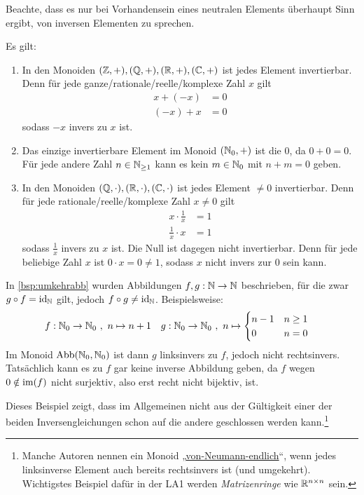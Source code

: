 \begin{bem}
    Beachte, dass es nur bei Vorhandensein eines neutralen Elements überhaupt Sinn ergibt, von inversen Elementen zu sprechen. 
\end{bem}


\begin{bsp} \label{bsp:inverse}
    Es gilt:
    \begin{enumerate}
        \item In den Monoiden $(\mathbb Z,+),(\mathbb Q,+),(\mathbb R,+),(\mathbb C,+)$ ist jedes Element invertierbar. Denn für jede ganze/rationale/reelle/komplexe Zahl $x$ gilt
        \begin{align*}
            x + (-x) & = 0 \\
            (-x) + x & = 0
        \end{align*}
        sodass $-x$ invers zu $x$ ist.
        \item Das einzige invertierbare Element im Monoid $(\mathbb N_0,+)$ ist die $0$, da $0+0=0$. Für jede andere Zahl $n\in \mathbb N_{\ge 1}$ kann es kein $m\in \mathbb N_0$ mit $n+m=0$ geben.
        \item In den Monoiden $(\mathbb Q,\cdot),(\mathbb R,\cdot),(\mathbb C,\cdot)$ ist jedes Element $\neq 0$ invertierbar. Denn für jede rationale/reelle/komplexe Zahl $x\neq 0$ gilt
        \begin{align*}
            x \cdot \frac{1}{x} & = 1 \\
            \frac{1}{x}\cdot x & = 1
        \end{align*}
        sodass $\frac{1}{x}$ invers zu $x$ ist. Die Null ist dagegen nicht invertierbar. Denn für jede beliebige Zahl $x$ ist $0\cdot x = 0\neq 1$, sodass $x$ nicht invers zur $0$ sein kann.
    \end{enumerate}
\end{bsp}


\begin{bsp}[*]
    In \cref{bsp:umkehrabb} wurden Abbildungen $f,g:\mathbb N\to \mathbb N$ beschrieben, für die zwar $g\circ f=\mathrm{id}_\mathbb N$ gilt, jedoch $f\circ g\neq \mathrm{id}_\mathbb N$. Beispielsweise:
    \begin{align*}
        f : \mathbb N_0 \to \mathbb N_0 \ &,\ n \mapsto n+1 & g: \mathbb N_0 \to \mathbb N_0 \ &,\ n\mapsto \begin{cases} n-1 & n\ge 1 \\ 0 & n=0 \end{cases}
    \end{align*}
    Im Monoid $\operatorname{Abb}(\mathbb N_0,\mathbb N_0)$ ist dann $g$ linksinvers zu $f$, jedoch nicht rechtsinvers. Tatsächlich kann es zu $f$ gar keine inverse Abbildung geben, da $f$ wegen $0\notin \operatorname{im}(f)$ nicht surjektiv, also erst recht nicht bijektiv, ist.

    Dieses Beispiel zeigt, dass im Allgemeinen nicht aus der Gültigkeit einer der beiden Inversengleichungen schon auf die andere geschlossen werden kann.\footnote{Manche Autoren nennen ein Monoid „\href{https://en.wikipedia.org/wiki/Dedekind-finite_ring}{von-Neumann-endlich}“, wenn jedes linksinverse Element auch bereits rechtsinvers ist (und umgekehrt). Wichtigstes Beispiel dafür in der LA1 werden \emph{Matrizenringe} wie $\mathbb R^{n\times n}$ sein.}
\end{bsp}


